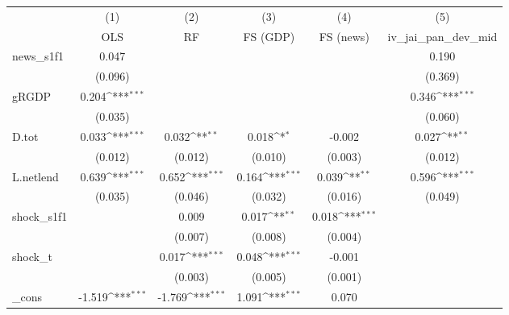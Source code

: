 {
\def\sym#1{\ifmmode^{#1}\else\(^{#1}\)\fi}
\begin{tabular}{l*{5}{c}}
\toprule
            &\multicolumn{1}{c}{(1)}&\multicolumn{1}{c}{(2)}&\multicolumn{1}{c}{(3)}&\multicolumn{1}{c}{(4)}&\multicolumn{1}{c}{(5)}\\
            &\multicolumn{1}{c}{OLS}&\multicolumn{1}{c}{RF}&\multicolumn{1}{c}{FS (GDP)}&\multicolumn{1}{c}{FS (news)}&\multicolumn{1}{c}{iv\_jai\_pan\_dev\_mid}\\
\midrule
news\_s1f1   &       0.047         &                     &                     &                     &       0.190         \\
            &     (0.096)         &                     &                     &                     &     (0.369)         \\
\addlinespace
gRGDP       &       0.204\sym{***}&                     &                     &                     &       0.346\sym{***}\\
            &     (0.035)         &                     &                     &                     &     (0.060)         \\
\addlinespace
D.tot       &       0.033\sym{***}&       0.032\sym{**} &       0.018\sym{*}  &      -0.002         &       0.027\sym{**} \\
            &     (0.012)         &     (0.012)         &     (0.010)         &     (0.003)         &     (0.012)         \\
\addlinespace
L.netlend   &       0.639\sym{***}&       0.652\sym{***}&       0.164\sym{***}&       0.039\sym{**} &       0.596\sym{***}\\
            &     (0.035)         &     (0.046)         &     (0.032)         &     (0.016)         &     (0.049)         \\
\addlinespace
shock\_s1f1  &                     &       0.009         &       0.017\sym{**} &       0.018\sym{***}&                     \\
            &                     &     (0.007)         &     (0.008)         &     (0.004)         &                     \\
\addlinespace
shock\_t     &                     &       0.017\sym{***}&       0.048\sym{***}&      -0.001         &                     \\
            &                     &     (0.003)         &     (0.005)         &     (0.001)         &                     \\
\addlinespace
\_cons      &      -1.519\sym{***}&      -1.769\sym{***}&       1.091\sym{***}&       0.070         &                     \\

\end{tabular}}
